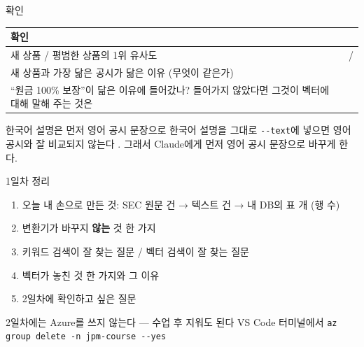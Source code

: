 \begin{frame}{ 확인}
\begin{tabularx}{\textwidth}{@{}X p{5.6cm}@{}}
\toprule
\textbf{확인} & \\
\midrule
새 상품 / 평범한 상품의 1위 유사도 & \hfill / \hfill\null \\[8pt]
새 상품과 가장 닮은 공시가 닮은 이유 (무엇이 같은가) & \\[8pt]
``원금 100\% 보장''이 닮은 이유에 들어갔나? 들어가지 않았다면 그것이 벡터에 대해 말해 주는 것은 & \\[8pt]
\bottomrule
\end{tabularx}
\vspace{0.6em}
\begin{alertblock}{한국어 설명은 먼저 영어 공시 문장으로}
\small 한국어 설명을 그대로 \texttt{-{}-text}에 넣으면 영어 공시와 잘 비교되지 않는다 . 그래서 Claude에게 먼저 영어 공시 문장으로 바꾸게 한다.
\end{alertblock}
\end{frame}

\begin{frame}{ 1일차 정리 }
\begin{enumerate}\setlength\itemsep{7pt}
\item 오늘 내 손으로 만든 것: SEC 원문 \underline{\hspace{1.2cm}}건 → 텍스트 \underline{\hspace{1.2cm}}건 → 내 DB의 표 \underline{\hspace{1.2cm}}개 (행 수)
\item 변환기가 바꾸지 \textbf{않는} 것 한 가지
\item 키워드 검색이 잘 찾는 질문 / 벡터 검색이 잘 찾는 질문
\item 벡터가 놓친 것 한 가지와 그 이유 
\item 2일차에 확인하고 싶은 질문
\end{enumerate}
\vspace{0.6em}
\begin{alertblock}{2일차에는 Azure를 쓰지 않는다 — 수업 후 지워도 된다}
VS Code 터미널에서 \texttt{az group delete -n jpm-course -{}-yes} 
\end{alertblock}
\end{frame}
